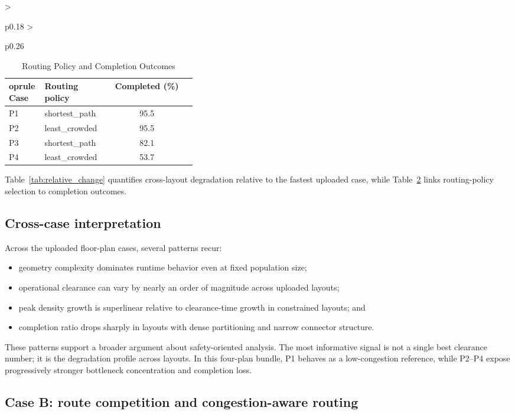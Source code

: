 \documentclass[conference]{IEEEtran}
\begin{document}
\begin{table}[htbp]
\begin{tabular}{>{\raggedright\arraybackslash}p{0.18\linewidth} >{\raggedright\arraybackslash}p{0.26\linewidth}}
\begin{table}[htbp]
\caption{Routing Policy and Completion Outcomes}
\label{tab:exit_distribution}
\centering
\begin{tabular}{>{\raggedright\arraybackslash}p{0.19\linewidth} >{\raggedright\arraybackslash}p{0.18\linewidth} c}
	oprule
Case & Routing policy & Completed (\%) \\
\midrule
P1 & shortest\_path & 95.5 \\
P2 & least\_crowded & 95.5 \\
P3 & shortest\_path & 82.1 \\
P4 & least\_crowded & 53.7 \\
\bottomrule
\end{tabular}
\end{table}

Table~\ref{tab:relative_change} quantifies cross-layout degradation relative to the fastest uploaded case, while Table~\ref{tab:exit_distribution} links routing-policy selection to completion outcomes.

\subsection{Cross-case interpretation}

Across the uploaded floor-plan cases, several patterns recur:
\begin{itemize}
    \item geometry complexity dominates runtime behavior even at fixed population size;
    \item operational clearance can vary by nearly an order of magnitude across uploaded layouts;
    \item peak density growth is superlinear relative to clearance-time growth in constrained layouts; and
    \item completion ratio drops sharply in layouts with dense partitioning and narrow connector structure.
\end{itemize}

These patterns support a broader argument about safety-oriented analysis. The most informative signal is not a single best clearance number; it is the degradation profile across layouts. In this four-plan bundle, P1 behaves as a low-congestion reference, while P2--P4 expose progressively stronger bottleneck concentration and completion loss.

\subsection{Case B: route competition and congestion-aware routing}


\end{tabular}
\end{table}
\end{document}
